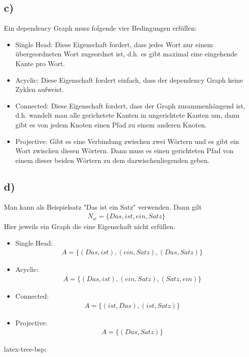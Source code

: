 \documentclass[a4paper,11pt,fleqn]{scrartcl}
\begin{document}
\subsection*{c)}
Ein dependency Graph muss folgende vier Bedingungen erfüllen:
\begin{itemize}
 \item Single Head: Diese Eigenschaft fordert, dass jedes Wort nur einem übergeordneten Wort zugeordnet ist, d.h. es gibt maximal eine eingehende Kante pro Wort. 
 \item Acyclic: Diese Eigenschaft fordert einfach, dass der dependency Graph keine Zyklen aufweist.   
 \item Connected: Diese Eigenschaft fordert, dass der Graph zusammenhängend ist, d.h. wandelt man alle gerichetete Kanten in ungerichtete Kanten um, dann gibt es von jedem Knoten einen Pfad zu einem anderen Knoten. 
 \item Projective: Gibt es eine Verbindung zwischen zwei Wörtern und es gibt ein Wort zwischen diesen Wörtern. Dann muss es einen gerichteten Pfad von einem dieser beiden Wörtern zu dem dazwischenliegenden geben.    
\end{itemize}

\subsection*{d)}

Man kann als Beispielsatz "Das ist ein Satz" verwenden. Dann gilt
\begin{align*}
N_w = \{Das, ist, ein, Satz\}
\end{align*}
Hier jeweils ein Graph die eine Eigenschaft nicht erfüllen. 
\begin{itemize}
\item Single Head:
\begin{align*}
A = \{(Das,ist),(ein,Satz),(Das, Satz)\}
\end{align*}
\item Acyclic:
\begin{align*}
A = \{(Das,ist),(ein,Satz),(Satz,ein)\}
\end{align*}
\item Connected:
\begin{align*}
A = \{(ist,Das),(ist,Satz)\}
\end{align*}
\item Projective:
\begin{align*}
A = \{(Das,Satz)\}
\end{align*}
\end{itemize}
latex-tree-bsp:\\ 
\end{document}
